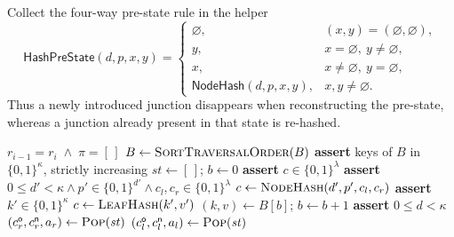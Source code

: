 \documentclass[11pt]{article}
\begin{document}
Collect the four-way pre-state rule in the helper
\begin{equation}
\mathsf{HashPreState}(d,p,x,y) =
  \begin{cases}
    \varnothing, & (x,y)=(\varnothing,\varnothing),\\
    y,           & x=\varnothing,\ y\neq\varnothing,\\
    x,           & x\neq\varnothing,\ y=\varnothing,\\
    \mathsf{NodeHash}(d,p,x,y), & x,y\neq\varnothing.
  \end{cases}
\label{eq:hash-pre-state}
\end{equation}
Thus a newly introduced junction disappears when reconstructing the pre-state, whereas a junction already present in that state is re-hashed.

\begin{algorithm}[t!]
  \caption{Stack-machine verification of the RSMT consistency proof}\label{alg:stackverify}
  \footnotesize
  \begin{algorithmic}[0]
        \State \Return $r_{i-1} = r_i \;\land\; \pi = [\,]$
      \EndIf
      \State $B \gets \Call{SortTraversalOrder}{B}$
      \State \textbf{assert} keys of $B$ in $\{0,1\}^{\kappa}$, strictly increasing
      \State $\mathit{st} \gets [\,]$; \quad $b \gets 0$ 
         
          \State \textbf{assert} $c \in \{0,1\}^{\lambda}$
          \State {}
         
          \State \textbf{assert} $0 \le d' < \kappa \land p' \in \{0,1\}^{d'} \land c_l, c_r \in \{0,1\}^{\lambda}$
          \State $c \gets \Call{NodeHash}{d', p', c_l, c_r}$
          \State {}
         
          \State \textbf{assert} $k' \in \{0,1\}^{\kappa}$
          \State $c \gets \Call{LeafHash}{k', v'}$
          \State {}
         
          \State $(k, v) \gets B[b]$; \quad $b \gets b + 1$
          \State {}
         
          \State \textbf{assert} $0 \le d < \kappa$
          \State $(c^{\mathsf o}_r, c^{\mathsf n}_r, a_r) \gets \Call{Pop}{\mathit{st}}$
          \State $(c^{\mathsf o}_l, c^{\mathsf n}_l, a_l) \gets \Call{Pop}{\mathit{st}}$

\end{algorithmic}
\end{algorithm}
\end{document}
